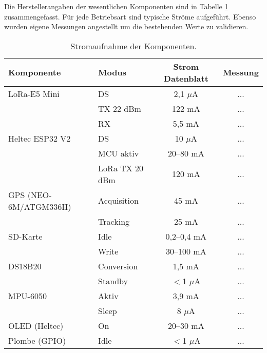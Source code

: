 Die Herstellerangaben der wesentlichen Komponenten sind in Tabelle \ref{tab:stromverbrauch} zusammengefasst. 
Für jede Betriebsart sind typische Ströme aufgeführt. Ebenso wurden eigene Messungen angestellt um die bestehenden Werte zu validieren.

\begin{table}[H]
\centering
\scriptsize
\begin{tabular}{|l|l|c|c|}
\hline
\textbf{Komponente} & \textbf{Modus} & \textbf{Strom Datenblatt} & \textbf{Messung} \\ \hline
LoRa-E5 Mini & DS & 2,1 $\mu$A \cite{stm32wl} & ... \\ \hline
 & TX 22 dBm & 122 mA \cite{seeed_lorae5} & ... \\ \hline
 & RX & 5,5 mA \cite{seeed_lorae5} & ... \\ \hline
Heltec ESP32 V2 & DS & 10 $\mu$A \cite{esp32_datasheet} & ... \\ \hline
 & MCU aktiv & 20--80 mA \cite{esp32_datasheet} & ... \\ \hline
 & LoRa TX 20 dBm & 120 mA \cite{sx1276_datasheet} & ... \\ \hline
GPS (NEO-6M/ATGM336H) & Acquisition & 45 mA \cite{ublox_neo6m} & ... \\ \hline
 & Tracking & 25 mA \cite{ublox_neo6m} & ... \\ \hline
SD-Karte & Idle & 0,2--0,4 mA \cite{sandisk_sd} & ... \\ \hline
 & Write & 30--100 mA \cite{sandisk_sd} & ... \\ \hline
DS18B20 & Conversion & 1,5 mA \cite{ds18b20} & ... \\ \hline
 & Standby & $<$1 $\mu$A \cite{ds18b20} & ... \\ \hline
MPU-6050 & Aktiv & 3,9 mA \cite{mpu6050} & ... \\ \hline
 & Sleep & 8 $\mu$A \cite{mpu6050} & ... \\ \hline
OLED (Heltec) & On & 20--30 mA \cite{heltec_doc} & ... \\ \hline
Plombe (GPIO) & Idle & $<$1 $\mu$A & ... \\ \hline
\end{tabular}
\caption{Stromaufnahme der Komponenten.}
\label{tab:stromverbrauch}
\end{table}